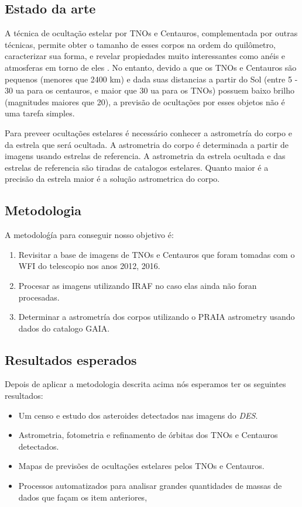 \documentclass[a4paper, 11pt]{article}
\begin{document}
\subsection{Estado da arte}

A técnica de ocultação estelar por TNOs e Centauros, complementada por outras técnicas, permite obter o tamanho de esses corpos na ordem do quilômetro, caracterizar sua forma, e revelar propiedades muito interessantes como anéis \citep{2017Natur.550..219O, 2014AGUFM.P43F..01B} e atmosferas em torno de eles \citep{1538-3881-136-5-1757, 2006Natur.439...52S}. No entanto, devido a que os TNOs e Centauros são pequenos (menores que 2400 km) e dada suas distancias a partir do Sol (entre  5 - 30 ua para os centauros, e maior que 30 ua para os TNOs) possuem baixo brilho (magnitudes maiores que 20), a previsão de ocultações por esses objetos não é uma tarefa simples. 

Para preveer ocultações estelares é necessário conhecer a astrometría do corpo e da estrela que será ocultada. A astrometria do corpo é determinada a partir de imagens usando estrelas de referencia. A astrometria da estrela ocultada e das estrelas de referencia são tiradas de catalogos estelares. Quanto maior é a precisão da estrela maior é a solução astrometrica do corpo.   


\subsection{Metodologia}

A metodoloǵía para conseguir nosso objetivo é:

\begin{enumerate}
  \item Revisitar a base de imagens de TNOs e Centauros que foram tomadas com o WFI do telescopio nos anos 2012, 2016.
  \item Procesar as imagens utilizando IRAF no caso elas ainda não foran procesadas.
  \item Determinar a astrometría dos corpos utilizando o PRAIA astrometry usando dados do catalogo GAIA.
\end{enumerate}

\subsection{Resultados esperados}

Depois de aplicar a metodologia descrita acima n\'os esperamos ter os seguintes resultados:
\begin{itemize}
\item Um censo e estudo dos asteroides detectados nas imagens do \textit{DES}.
\item Astrometria, fotometria e refinamento de \'orbitas dos TNOs e Centauros detectados.
\item Mapas de previs\~oes de oculta\c{c}\~oes estelares pelos TNOs e Centauros.
\item Processos automatizados para analisar grandes quantidades de massas de dados que fa\c{c}am os item anteriores,
\end{itemize}
\end{document}
